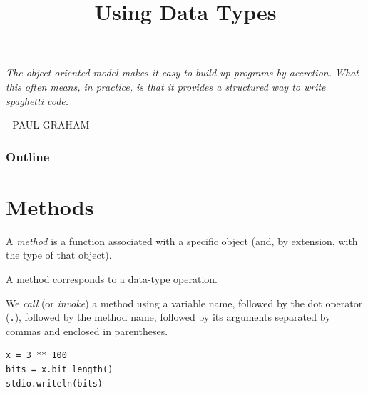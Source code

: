 \documentclass[8pt,a4paper,compress,handout]{beamer}
\title{Using Data Types}
\date{}
\begin{document}
\begin{frame}
\hfill
\begin{minipage}{150pt}
\begin{flushright}
\tiny \emph{The object-oriented model makes it easy to build up programs by accretion. What this often means, in practice, is that it provides a structured way to write spaghetti code.}

\smallskip

- PAUL GRAHAM
\end{flushright}
\end{minipage}
\vfill
\titlepage
\end{frame}

\begin{frame}
\frametitle{Outline}
\tableofcontents
\end{frame}

\section{Methods}
\begin{frame}[fragile]
A \emph{method} is a function associated with a specific object (and, by extension, with the type of that object).

\bigskip

A method corresponds to a data-type operation.

\bigskip

We \emph{call} (or \emph{invoke}) a method using a variable name, followed by the dot operator (\lstinline{.}), followed by the method name, followed by its arguments separated by commas and enclosed in parentheses.

\begin{lstlisting}[language={}]
x = 3 ** 100
bits = x.bit_length()
stdio.writeln(bits)
\end{lstlisting}
\end{frame}
\end{document}
